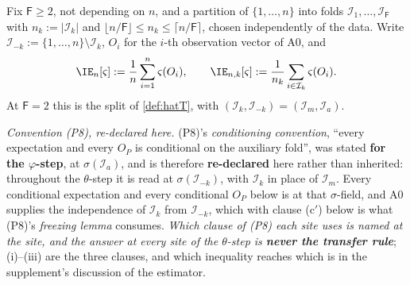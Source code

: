 \begin{definition}\label{def:crossfit}
Fix $\mathsf F\ge2$, not depending on $n$, and a partition of $\{1,\dots,n\}$ into folds
$\mathcal I_1,\dots,\mathcal I_{\mathsf F}$ with $n_k:=|\mathcal I_k|$ and
$\lfloor n/\mathsf F\rfloor\le n_k\le\lceil n/\mathsf F\rceil$, chosen independently of the data. Write
$\mathcal I_{-k}:=\{1,\dots,n\}\setminus\mathcal I_k$, $O_i$ for the $i$-th observation vector of A0, and
\[
\IE_n[\varsigma]:=\frac1n\sum_{i=1}^{n}\varsigma(O_i),
\qquad
\IE_{n,k}[\varsigma]:=\frac1{n_k}\sum_{i\in\mathcal I_k}\varsigma(O_i) .
\]
At $\mathsf F=2$ this is the split of \cref{def:hatT}, with $(\mathcal I_k,\mathcal I_{-k})=(\mathcal I_m,\mathcal I_a)$.

\emph{Convention \textup{(P8)}, re-declared here.} \textup{(P8)}'s \emph{conditioning convention}, ``every expectation and every $O_P$ is
conditional on the auxiliary fold'', was stated \textbf{for the $\varphi$-step}, at $\sigma(\mathcal I_a)$, and is
therefore \textbf{re-declared} here rather than inherited: throughout the $\theta$-step it is read at
$\sigma(\mathcal I_{-k})$, with $\mathcal I_k$ in place of $\mathcal I_m$. Every conditional expectation and every conditional $O_P$ below is at that
$\sigma$-field, and A0 supplies the independence of $\mathcal I_k$ from $\mathcal I_{-k}$, which with
clause \textup{(c$'$)} below is what \textup{(P8)}'s \emph{freezing lemma} consumes.
\emph{Which clause of \textup{(P8)} each site uses is named at the site, and the answer at every site of
the $\theta$-step is \textbf{never the transfer rule}}; (i)--(iii) are the three
clauses, and which inequality reaches which is in the supplement's discussion of the estimator.


\end{definition}
